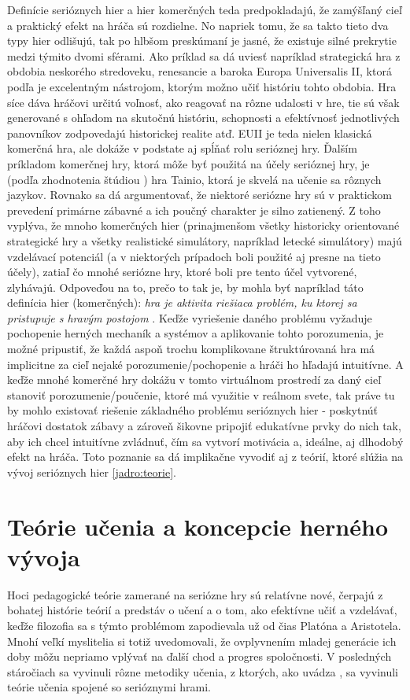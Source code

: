 \documentclass[10pt,twoside,slovak,a4paper]{article}
\begin{document}
Definície serióznych hier a hier komerčných teda predpokladajú, že zamýšľaný cieľ a praktický efekt na hráča sú rozdielne. No napriek tomu, že sa takto tieto dva typy hier odlišujú, tak po hlbšom preskúmaní je jasné, že existuje silné prekrytie medzi týmito dvomi sférami. Ako príklad sa dá uviesť napríklad strategická hra z obdobia neskorého stredoveku, renesancie a baroka Europa Universalis II, ktorá podľa \cite{egenfeldt2012europa} je excelentným nástrojom, ktorým možno učiť históriu tohto obdobia. Hra síce dáva hráčovi určitú voľnosť, ako reagovať na rôzne udalosti v hre, tie sú však generované s ohľadom na skutočnú históriu, schopnosti a efektívnosť jednotlivých panovníkov zodpovedajú historickej realite atď. EUII je teda nielen klasická komerčná hra, ale dokáže v podstate aj spĺňať rolu serióznej hry. Ďalším príkladom komerčnej hry, ktorá môže byť použitá na účely serióznej hry, je (podľa zhodnotenia štúdiou \cite{backlund2013educational}) hra Tainio, ktorá je skvelá na učenie sa rôznych jazykov.
Rovnako sa dá argumentovať, že niektoré seriózne hry sú v praktickom prevedení primárne zábavné a ich poučný charakter je silno zatienený. Z toho vyplýva, že mnoho komerčných hier (prinajmenšom všetky historicky orientované strategické hry a všetky realistické simulátory, napríklad letecké simulátory) majú vzdelávací potenciál (a v niektorých prípadoch boli použité aj presne na tieto účely), zatiaľ čo mnohé seriózne hry, ktoré boli pre tento účel vytvorené, zlyhávajú. Odpoveďou na to, prečo to tak je, by mohla byť napríklad táto definícia hier (komerčných): \emph{hra je aktivita riešiaca problém, ku ktorej sa pristupuje s hravým postojom} \cite{schell2008art}. Keďže vyriešenie daného problému vyžaduje pochopenie herných mechaník a systémov a aplikovanie tohto porozumenia, je možné pripustiť, že každá aspoň trochu komplikovane štruktúrovaná hra má implicitne za cieľ nejaké porozumenie/pochopenie a hráči ho hľadajú intuitívne. A keďže mnohé komerčné hry dokážu v tomto virtuálnom prostredí za daný cieľ stanoviť porozumenie/poučenie, ktoré má využitie v reálnom svete, tak práve tu by mohlo existovať riešenie základného problému serióznych hier - poskytnúť hráčovi dostatok zábavy a zároveň šikovne pripojiť edukatívne prvky do nich tak, aby ich chcel intuitívne zvládnuť, čím sa vytvorí motivácia a, ideálne, aj dlhodobý efekt na hráča. Toto poznanie sa dá implikačne vyvodiť aj z teórií, ktoré slúžia na vývoj serióznych hier \ref{jadro:teorie}.

\section{Teórie učenia a koncepcie herného vývoja} \label{jadro}
Hoci pedagogické teórie zamerané na seriózne hry sú relatívne nové, čerpajú z bohatej histórie teórií a predstáv o učení a o tom, ako efektívne učiť a vzdelávať, keďže filozofia sa s týmto problémom zapodievala už od čias Platóna a Aristotela. Mnohí veľkí myslitelia si totiž uvedomovali, že ovplyvnením mladej generácie ich doby môžu nepriamo vplývať na ďalší chod a progres spoločnosti. V posledných stáročiach sa vyvinuli rôzne metodiky učenia, z ktorých, ako uvádza \cite{natucci2021experience}, sa vyvinuli teórie učenia spojené so serióznymi hrami.
\end{document}
